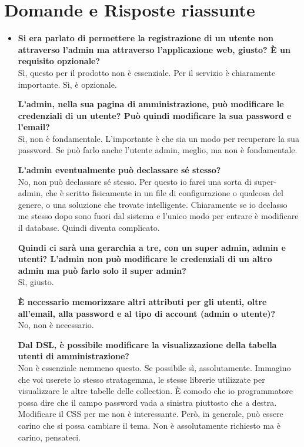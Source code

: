 \section{Domande e Risposte riassunte}
	\begin{itemize} 
		\item 
		{\bfseries Si era parlato di permettere la registrazione di un utente non attraverso l'admin ma attraverso l'applicazione web, giusto? È un requisito opzionale?} \\
		Sì, questo per il prodotto non è essenziale. Per il servizio è chiaramente importante. Sì, è opzionale.
		
		{\bfseries L'admin, nella sua pagina di amministrazione, può modificare le credenziali di un utente? Può quindi modificare la sua password e l'email?} \\
		Sì, non è fondamentale. L'importante è che sia un modo per recuperare la sua password. Se può farlo anche l'utente admin, meglio, ma non è fondamentale.
		
		{\bfseries L'admin eventualmente può declassare sé stesso?} \\
		No, non può declassare sé stesso. Per questo io farei una sorta di super-admin, che è scritto fisicamente in un file di configurazione o qualcosa del genere, o una soluzione che trovate intelligente. Chiaramente se io declasso me stesso dopo sono fuori dal sistema e l'unico modo per entrare è modificare il database. Quindi diventa complicato.
		
		{\bfseries Quindi ci sarà una gerarchia a tre, con un super admin, admin e utenti? L'admin non può modificare le credenziali di un altro admin ma può farlo solo il super admin?} \\
		Sì, giusto.
		
		{\bfseries È necessario memorizzare altri attributi per gli utenti, oltre all'email, alla password e al tipo di account (admin o utente)?} \\
		No, non è necessario.
		
		{\bfseries Dal DSL, è possibile modificare la visualizzazione della tabella utenti di amministrazione?} \\
		Non è essenziale nemmeno questo. Se possibile sì, assolutamente. Immagino che voi userete lo stesso stratagemma, le stesse librerie utilizzate per visualizzare le altre tabelle delle collection.
		È comodo che io programmatore possa dire che il campo password vada a sinistra piuttosto che a destra. Modificare il CSS per me non è interessante. Però, in generale, può essere carino che si possa cambiare il tema. Non è assolutamente richiesto ma è carino, pensateci.
		

\end{itemize}
